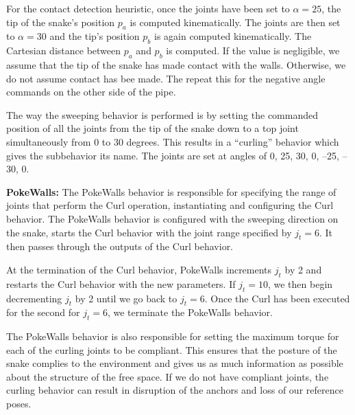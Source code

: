 For the contact detection heuristic, once the joints have been set to $\alpha = 25$, the tip of the snake's position $p_a$ is computed kinematically. The joints are then set to $\alpha = 30$ and the tip's position $p_b$ is again computed kinematically. The Cartesian distance between $p_a$ and $p_b$ is computed. If the value is negligible, we assume that the tip of the snake has made contact with the walls. Otherwise, we do not assume contact has bee made. The repeat this for the negative angle commands on the other side of the pipe. 

The way the sweeping behavior is performed is by setting the commanded position of all the joints from the tip of the snake down to a top joint simultaneously from 0 to 30 degrees. This results in a ``curling'' behavior which gives the subbehavior its name. The joints are set at angles of 0, 25, 30, 0, --25, --30, 0.




\textbf{PokeWalls:} The PokeWalls behavior is responsible for specifying the range of joints that perform the Curl operation, instantiating and configuring the Curl behavior. The PokeWalls behavior is configured with the sweeping direction on the snake, starts the Curl behavior with the joint range specified by $j_t = 6$. It then passes through the outputs of the Curl behavior.

At the termination of the Curl behavior, PokeWalls increments $j_t$ by 2 and restarts the Curl behavior with the new parameters. If $j_t = 10$, we then begin decrementing $j_t$ by 2 until we go back to $j_t = 6$. Once the Curl has been executed for the second for $j_t = 6$, we terminate the PokeWalls behavior.

The PokeWalls behavior is also responsible for setting the maximum torque for each of the curling joints to be compliant. This ensures that the posture of the snake complies to the environment and gives us as much information as possible about the structure of the free space. If we do not have compliant joints, the curling behavior can result in disruption of the anchors and loss of our reference poses.




